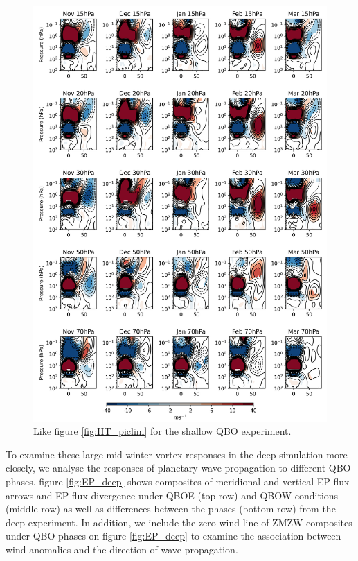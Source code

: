 \begin{figure}[h!]
\begin{center}
\noindent\includegraphics[width = 0.9\linewidth]{Figures/Figures-deepQBO/ZMZW_composites_by_month_QBO_phases_U_s_MarQBO_vs_Mar_70hPa_5thresh.png}
\caption[ZMZW composites under QBO phases in the shallow QBO simulation]{Like figure \ref{fig:HT_piclim} for the shallow QBO experiment.}
\label{fig:HT_shallow}
\end{center}
\end{figure}
\newpage 

To examine these large mid-winter vortex responses in the deep simulation more closely, we analyse the responses of planetary wave propagation to different QBO phases. figure \ref{fig:EP_deep} shows composites of meridional and vertical EP flux arrows and EP flux divergence under QBOE (top row) and QBOW conditions (middle row) as well as differences between the phases (bottom row) from the deep experiment. In addition, we include the zero wind line of ZMZW composites under QBO phases on figure \ref{fig:EP_deep} to examine the association between wind anomalies and the direction of wave propagation. 

